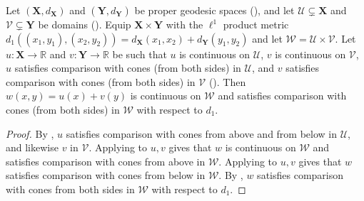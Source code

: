 \begin{corollary}
Let $(\mathbf X,d_{\mathbf X})$ and $(\mathbf Y,d_{\mathbf Y})$ be proper geodesic spaces (), and let $\mathcal U\subsetneq\mathbf X$ and $\mathcal V\subsetneq\mathbf Y$ be domains (). Equip $\mathbf X\times\mathbf Y$ with the $\ell^1$ product metric $d_1((x_1,y_1),(x_2,y_2))=d_{\mathbf X}(x_1,x_2)+d_{\mathbf Y}(y_1,y_2)$ and let $\mathcal W=\mathcal U\times\mathcal V$. Let $u:\mathbf X\to\mathbb R$ and $v:\mathbf Y\to\mathbb R$ be such that $u$ is continuous on $\mathcal U$, $v$ is continuous on $\mathcal V$, $u$ satisfies comparison with cones (from both sides) in $\mathcal U$, and $v$ satisfies comparison with cones (from both sides) in $\mathcal V$ (). Then $w(x,y)=u(x)+v(y)$ is continuous on $\mathcal W$ and satisfies comparison with cones (from both sides) in $\mathcal W$ with respect to $d_1$.
\end{corollary}
\begin{proof}
By , $u$ satisfies comparison with cones from above and from below in $\mathcal U$, and likewise $v$ in $\mathcal V$. Applying  to $u,v$ gives that $w$ is continuous on $\mathcal W$ and satisfies comparison with cones from above in $\mathcal W$. Applying  to $u,v$ gives that $w$ satisfies comparison with cones from below in $\mathcal W$. By , $w$ satisfies comparison with cones from both sides in $\mathcal W$ with respect to $d_1$.
\end{proof}
